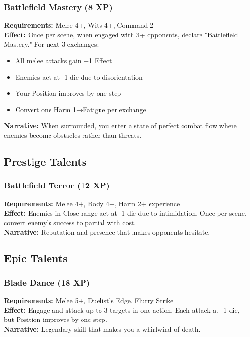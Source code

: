 \subsubsection{Battlefield Mastery (8 XP)}
\textbf{Requirements:} Melee 4+, Wits 4+, Command 2+ \\
\textbf{Effect:} Once per scene, when engaged with 3+ opponents, declare "Battlefield Mastery." For next 3 exchanges:
\begin{itemize}
    \item All melee attacks gain +1 Effect
    \item Enemies act at -1 die due to disorientation
    \item Your Position improves by one step
    \item Convert one Harm 1→Fatigue per exchange
\end{itemize}
\textbf{Narrative:} When surrounded, you enter a state of perfect combat flow where enemies become obstacles rather than threats.

\subsection{Prestige Talents}

\subsubsection{Battlefield Terror (12 XP)}
\textbf{Requirements:} Melee 4+, Body 4+, Harm 2+ experience \\
\textbf{Effect:} Enemies in Close range act at -1 die due to intimidation. Once per scene, convert enemy's success to partial with cost. \\
\textbf{Narrative:} Reputation and presence that makes opponents hesitate.

\subsection{Epic Talents}

\subsubsection{Blade Dance (18 XP)}
\textbf{Requirements:} Melee 5+, Duelist's Edge, Flurry Strike \\
\textbf{Effect:} Engage and attack up to 3 targets in one action. Each attack at -1 die, but Position improves by one step. \\
\textbf{Narrative:} Legendary skill that makes you a whirlwind of death.

